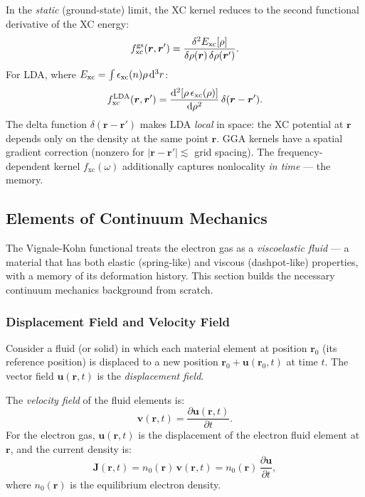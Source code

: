 \documentclass[12pt,letterpaper]{article}
\newcommand{\dd}{\mathrm{d}}
\newcommand{\fxc}{f_{\mathrm{xc}}}
\newcommand{\Exc}{E_{\mathrm{xc}}}
\theoremstyle{definition}
\begin{document}
In the \emph{static} (ground-state) limit, the XC kernel reduces to
the second functional derivative of the XC energy:
\begin{equation}
  \fxc^{\rm gs}(\bm{r},\bm{r}')
  = \frac{\delta^2 \Exc[\rho]}{\delta\rho(\bm{r})\,\delta\rho(\bm{r}')}.
  \label{eq:fxc_static_def}
\end{equation}
For LDA, where $\Exc = \int\epsilon_{\rm xc}(n)\rho\,\dd^3r$:
\begin{equation}
  \fxc^{\rm LDA}(\bm{r},\bm{r}')
  = \frac{\dd^2[\rho\,\epsilon_{\rm xc}(\rho)]}{\dd\rho^2}\,\delta(\bm{r}-\bm{r}').
  \label{eq:fxc_lda}
\end{equation}
The delta function $\delta(\bm{r}-\bm{r}')$ makes LDA \emph{local} in space:
the XC potential at $\bm{r}$ depends only on the density at the same
point $\bm{r}$.  GGA kernels have a spatial gradient correction
(nonzero for $|\bm{r}-\bm{r}'|\lesssim$ grid spacing).
The frequency-dependent kernel $\fxc(\omega)$ additionally captures
nonlocality \emph{in time} --- the memory.

\subsection{Elements of Continuum Mechanics}
\label{sec:mechanics}

The Vignale-Kohn functional treats the electron gas as a
\emph{viscoelastic fluid} --- a material that has both elastic
(spring-like) and viscous (dashpot-like) properties, with a
memory of its deformation history.  This section builds the
necessary continuum mechanics background from scratch.

\subsubsection{Displacement Field and Velocity Field}

Consider a fluid (or solid) in which each material element
at position $\bm{r}_0$ (its reference position) is displaced to
a new position $\bm{r}_0 + \bm{u}(\bm{r}_0,t)$ at time $t$.
The vector field $\bm{u}(\bm{r},t)$ is the \emph{displacement field}.

The \emph{velocity field} of the fluid elements is:
\begin{equation}
  \bm{v}(\bm{r},t) = \frac{\partial\bm{u}(\bm{r},t)}{\partial t}.
  \label{eq:velocity}
\end{equation}
For the electron gas, $\bm{u}(\bm{r},t)$ is the displacement of the
electron fluid element at $\bm{r}$, and the current density is:
\begin{equation}
  \bm{J}(\bm{r},t) = n_0(\bm{r})\,\bm{v}(\bm{r},t)
  = n_0(\bm{r})\,\frac{\partial\bm{u}}{\partial t},
  \label{eq:current_displacement}
\end{equation}
where $n_0(\bm{r})$ is the equilibrium electron density.
\end{document}

